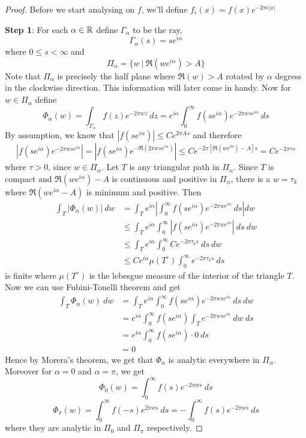 \begin{proof}
  Before we start analysing on $f$, we'll define $f_\epsilon(x) = f(x)e^{-2\pi \epsilon |x|}$

  \textbf{Step 1}: For each $\alpha \in \mathbb R$ define $\Gamma_\alpha$ to be the ray, $$\Gamma_\alpha(s) = se^{i\alpha}$$
  where $0\le s <\infty$ and $$\Pi_\alpha = \{w\ | \ \Re(we^{i\alpha}) > A\}$$
  Note that $\Pi_\alpha$ is precisely the half plane where $\Re(w) > A$ rotated by $\alpha$ degress in the clockwise direction. This information will later come in handy. Now for $w \in \Pi_\alpha$ define $$ \Phi_\alpha(w) = \int_{\Gamma_\alpha} f(z) e^{-2\pi wz} \ dz = e^{i\alpha}\int_0^\infty f(se^{i\alpha})e^{-2\pi wse^{i\alpha}} \ ds$$
  By assumption, we know that $\left|f(se^{i\alpha})\right| \le Ce^{2\pi As}$ and therefore $$\left|f(se^{i\alpha})e^{-2\pi wse^{i\alpha}}\right| = \left|f(se^{i\alpha})e^{-\Re(2\pi wse^{i\alpha})}\right| \le Ce^{-2\pi[\Re(we^{i\alpha}) - A]s} = Ce^{-2\pi \tau s}$$
  where $\tau > 0$, since $w \in \Pi_\alpha$. Let $T$ is any triangular path in $\Pi_\alpha$. Since $T$ is compact and $\Re(we^{i\alpha})-A$ is continuous and positive in $\Pi_\alpha$, there is a $w = \tau_k$ where $\Re(we^{i\alpha} - A)$ is minimum and positive. Then 
  \begin{align*}
    \int_T\left|\Phi_\alpha(w)\right| \ dw &= \int_T e^{i\alpha} \left|\int_0^\infty f(se^{i\alpha}) e^{-2\pi we^{i\alpha}} \ ds \right| dw \\
      & \le \int_T e^{i\alpha} \int_0^\infty \left|f(se^{i\alpha}) e^{-2\pi we^{i\alpha}} \right| \ ds \ dw \\
      & \le \int_T e^{i\alpha} \int_0^\infty Ce^{-2\pi \tau_k s} \ ds \ dw \\
      & \le Ce^{i\alpha} \mu(T^\circ) \int_0^\infty e^{-2\pi \tau_k s} \ ds
  \end{align*}
  is finite where $\mu(T^\circ)$ is the lebesgue measure of the interior of the triangle $T$. 
  Now we can use Fubini-Tonelli theorem and get
  \begin{align*}
    \int_T \Phi_\alpha(w) \ dw &= \int_T e^{i\alpha} \int_0^\infty f(se^{i\alpha}) e^{-2\pi w s e^{i\alpha}} \ ds \ dw \\
    & = e^{i\alpha}\int_0^\infty f(se^{i\alpha}) \int_T e^{-2\pi wse^{i\alpha}} \ dw \ ds \\
    & = e^{i\alpha} \int_0^\infty f(se^{i\alpha}) \cdot 0 \ ds \\
    & = 0
  \end{align*}
  Hence by Morera's theorem, we get that $\Phi_\alpha$ is analytic everywhere in $\Pi_\alpha$. Moreover for $\alpha = 0$ and $\alpha =  \pi$, we get
  $$\Phi_0(w) = \int_0^\infty f(s)e^{-2\pi w s} \ ds $$
  $$\Phi_\pi(w) = \int_0^\infty f(-s)e^{2\pi w s} \ ds = -\int_0^\infty f(s)e^{-2 \pi ws} \ ds$$
  where they are analytic in $\Pi_0$ and $\Pi_\pi$ respectively.
\end{proof}






